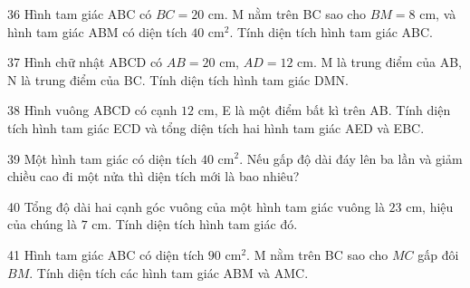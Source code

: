 \gap
\begin{probbox}{36}{}
Hình tam giác ABC có $BC=20$ cm. M nằm trên BC sao cho $BM=8$ cm, và hình tam giác ABM có diện tích $40$ cm$^2$. Tính diện tích hình tam giác ABC.
\end{probbox}
\gap
\begin{probbox}{37}{}
Hình chữ nhật ABCD có $AB=20$ cm, $AD=12$ cm. M là trung điểm của AB, N là trung điểm của BC. Tính diện tích hình tam giác DMN.
\end{probbox}
\gap
\begin{probbox}{38}{}
Hình vuông ABCD có cạnh $12$ cm, E là một điểm bất kì trên AB. Tính diện tích hình tam giác ECD và tổng diện tích hai hình tam giác AED và EBC.
\end{probbox}
\gap
\begin{probbox}{39}{}
Một hình tam giác có diện tích $40$ cm$^2$. Nếu gấp độ dài đáy lên ba lần và giảm chiều cao đi một nửa thì diện tích mới là bao nhiêu?
\end{probbox}
\gap
\begin{probbox}{40}{}
Tổng độ dài hai cạnh góc vuông của một hình tam giác vuông là $23$ cm, hiệu của chúng là $7$ cm. Tính diện tích hình tam giác đó.
\end{probbox}
\gap
\begin{probbox}{41}{}
Hình tam giác ABC có diện tích $90$ cm$^2$. M nằm trên BC sao cho $MC$ gấp đôi $BM$. Tính diện tích các hình tam giác ABM và AMC.
\end{probbox}
